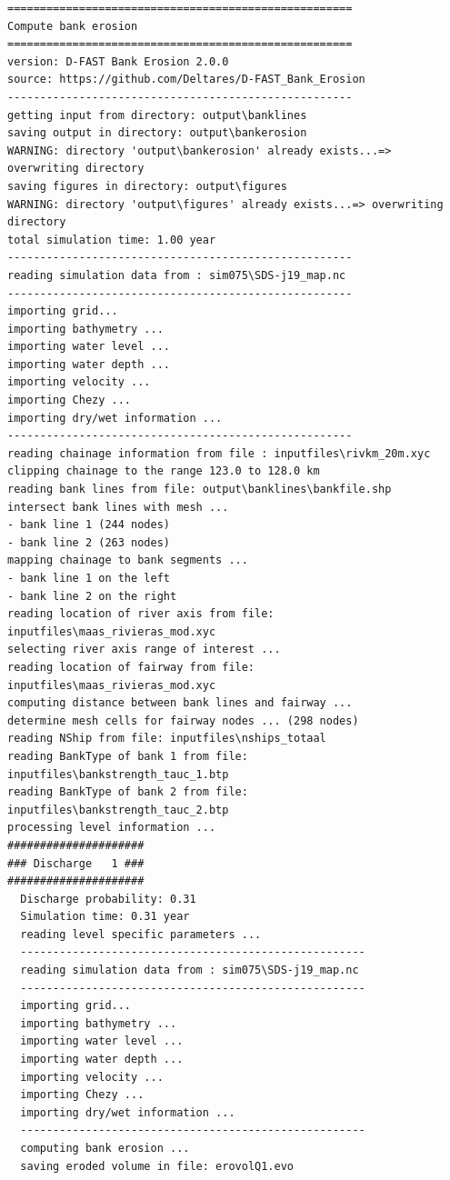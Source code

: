 \begin{Verbatim}
=====================================================
Compute bank erosion
=====================================================
version: D-FAST Bank Erosion 2.0.0
source: https://github.com/Deltares/D-FAST_Bank_Erosion
-----------------------------------------------------
getting input from directory: output\banklines
saving output in directory: output\bankerosion
WARNING: directory 'output\bankerosion' already exists...=> overwriting directory
saving figures in directory: output\figures
WARNING: directory 'output\figures' already exists...=> overwriting directory
total simulation time: 1.00 year
-----------------------------------------------------
reading simulation data from : sim075\SDS-j19_map.nc
-----------------------------------------------------
importing grid...
importing bathymetry ...
importing water level ...
importing water depth ...
importing velocity ...
importing Chezy ...
importing dry/wet information ...
-----------------------------------------------------
reading chainage information from file : inputfiles\rivkm_20m.xyc
clipping chainage to the range 123.0 to 128.0 km
reading bank lines from file: output\banklines\bankfile.shp
intersect bank lines with mesh ...
- bank line 1 (244 nodes)
- bank line 2 (263 nodes)
mapping chainage to bank segments ...
- bank line 1 on the left
- bank line 2 on the right
reading location of river axis from file: inputfiles\maas_rivieras_mod.xyc
selecting river axis range of interest ...
reading location of fairway from file: inputfiles\maas_rivieras_mod.xyc
computing distance between bank lines and fairway ...
determine mesh cells for fairway nodes ... (298 nodes)
reading NShip from file: inputfiles\nships_totaal
reading BankType of bank 1 from file: inputfiles\bankstrength_tauc_1.btp
reading BankType of bank 2 from file: inputfiles\bankstrength_tauc_2.btp
processing level information ...
#####################
### Discharge   1 ###
#####################
  Discharge probability: 0.31
  Simulation time: 0.31 year
  reading level specific parameters ...
  -----------------------------------------------------
  reading simulation data from : sim075\SDS-j19_map.nc
  -----------------------------------------------------
  importing grid...
  importing bathymetry ...
  importing water level ...
  importing water depth ...
  importing velocity ...
  importing Chezy ...
  importing dry/wet information ...
  -----------------------------------------------------
  computing bank erosion ...
  saving eroded volume in file: erovolQ1.evo


\end{Verbatim}
